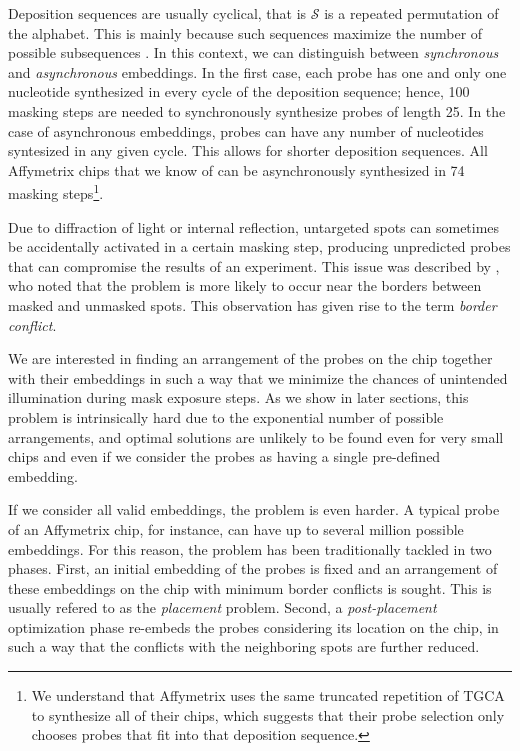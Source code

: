 \documentclass{bioinfo}
\begin{document}
Deposition sequences are usually cyclical, that is $\mathcal{S}$ is a repeated permutation of the alphabet. This is mainly because such sequences maximize the number of possible subsequences \citep{CHASE76}. In this context, we can distinguish between \emph{synchronous} and \emph{asynchronous} embeddings. In the first case, each probe has one and only one nucleotide synthesized in every cycle of the deposition sequence; hence, 100 masking steps are needed to synchronously synthesize probes of length 25. In the case of asynchronous embeddings, probes can have any number of nucleotides syntesized in any given cycle. This allows for shorter deposition sequences. All Affymetrix chips that we know of can be asynchronously synthesized in 74 masking steps\footnote{We understand that Affymetrix uses the same truncated repetition of TGCA to synthesize all of their chips, which suggests that their probe selection only chooses probes that fit into that deposition sequence.}.

Due to diffraction of light or internal reflection, untargeted spots can sometimes be accidentally activated in a certain masking step, producing unpredicted probes that can compromise the results of an experiment. This issue was described by \citealp{FODOR91}, who noted that the problem is more likely to occur near the borders between masked and unmasked spots. This observation has given rise to the term \emph{border conflict}.

We are interested in finding an arrangement of the probes on the chip together with their embeddings in such a way that we minimize the chances of unintended illumination during mask exposure steps. As we show in later sections, this problem is intrinsically hard due to the exponential number of possible arrangements, and optimal solutions are unlikely to be found even for very small chips and even if we consider the probes as having a single pre-defined embedding.

If we consider all valid embeddings, the problem is even harder. A typical probe of an Affymetrix chip, for instance, can have up to several million possible embeddings. For this reason, the problem has been traditionally tackled in two phases. First, an initial embedding of the probes is fixed and an arrangement of these embeddings on the chip with minimum border conflicts is sought. This is usually refered to as the \emph{placement} problem. Second, a \emph{post-placement} optimization phase re-embeds the probes considering its location on the chip, in such a way that the conflicts with the neighboring spots are further reduced.
\end{document}
